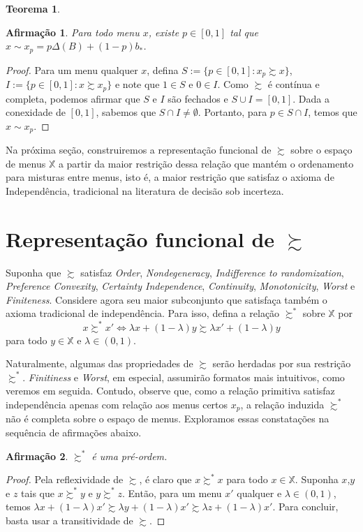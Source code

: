 \documentclass[11pt, a4paper]{article}
\theoremstyle{nonumberplain}
\newtheorem{proof}{Dem.}
\theoremstyle{plain}
\newtheorem{theorem}{Teorema}
\theoremstyle{plain}
\newtheorem{claim}{Afirmação}
\theoremstyle{plain}
\begin{document}
\begin{theorem} \label{nossoteorema}  \end{theorem} 


\begin{claim}Para todo menu $x$, existe $p\in[0,1]$ tal que $x\sim x_p=p\Delta(B)+(1-p)b_*$. \end{claim}
\begin{proof}
Para um menu qualquer $x$, defina $S:=\{p\in[0,1] : x_p\succsim x\}$, $I:=\{p\in[0,1] : x\succsim x_p\}$ e note que $1\in S$ e $0\in I$. Como $\succsim$ é contínua e completa, podemos afirmar que $S$ e $I$ são fechados e $S\cup I=[0,1]$. Dada a conexidade de $[0,1]$, sabemos que $S\cap I\neq \emptyset$. Portanto, para $p\in S\cap I$, temos que $x\sim x_p$.   
\end{proof}

Na próxima seção, construiremos a representação funcional de $\succsim$ sobre o espaço de menus $\mathbb{X}$ a partir da maior restrição dessa relação que mantém o ordenamento para misturas entre menus, isto é, a maior restrição que satisfaz o axioma de Independência, tradicional na literatura de decisão sob incerteza. 

\section{Representação funcional de $\succsim$}

Suponha que $\succsim$ satisfaz \textit{Order}, \textit{Nondegeneracy}, \textit{Indifference to randomization}, \textit{Preference Convexity}, \textit{Certainty Independence}, \textit{Continuity}, \textit{Monotonicity}, \textit{Worst} e \textit{Finiteness}. Considere agora seu maior subconjunto que satisfaça também o axioma tradicional de independência. Para isso, defina a relação $\succsim^*$ sobre $\mathbb{X}$ por $$x\succsim^* x' \Leftrightarrow \lambda x + (1-\lambda)y \succsim \lambda x' + (1-\lambda)y$$ para todo $y\in \mathbb{X}$ e $\lambda\in(0,1)$.

Naturalmente, algumas das propriedades de $\succsim$ serão herdadas por sua restrição $\succsim^*$. \textit{Finitiness} e \textit{Worst}, em especial, assumirão formatos mais intuitivos, como veremos em seguida. Contudo, observe que, como a relação primitiva satisfaz independência apenas com relação aos menus certos $x_p$, a relação induzida $\succsim^*$ não é completa sobre o espaço de menus. Exploramos essas constatações na sequência de afirmações abaixo.


\begin{claim}$\succsim^*$ é uma pré-ordem. \end{claim}
\begin{proof} Pela reflexividade de $\succsim$, é claro que $x\succsim^* x$ para todo $x\in \mathbb{X}$. Suponha $x$,$y$ e $z$ tais que $x\succsim^* y$ e $y\succsim^* z$. Então, para um menu $x'$ qualquer e $\lambda\in(0,1)$, temos $\lambda x + (1-\lambda)x'\succsim \lambda y + (1-\lambda)x'\succsim \lambda z + (1-\lambda)x'$. Para concluir, basta usar a transitividade de $\succsim$.
\end{proof}
\end{document}
